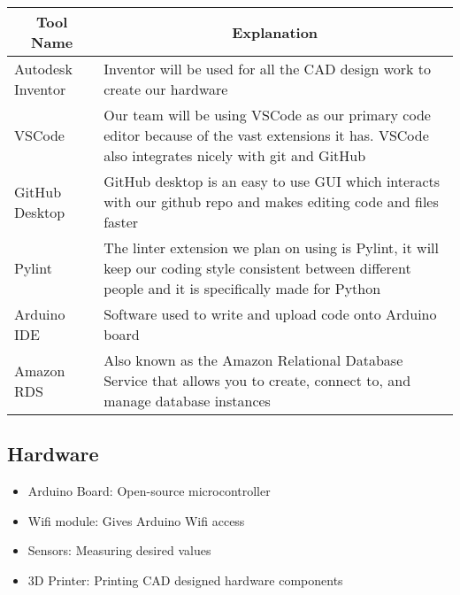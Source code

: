 \documentclass{article}
\begin{document}
\begin{table}[!hbt]
	\centering
	\begin{tabular}{|p{4cm}|p{8cm}|}
	\hline
	\multicolumn{1}{|c|}{\textbf{Tool Name}} & \multicolumn{1}{c|}{\textbf{Explanation}} 
	\\ \hline
	Autodesk Inventor
	&  Inventor will be used for all the CAD design work to create our hardware  
	\newline                              
	\\ \hline
	VSCode
	&  Our team will be using VSCode as our primary code editor because of the vast extensions it has. VSCode also integrates nicely with git and GitHub
	\newline                              
	\\ \hline
	GitHub Desktop
	&  GitHub desktop is an easy to use GUI which interacts with our github repo and makes editing code and files faster
	\newline                              
	\\ \hline
	Pylint
	&  The linter extension we plan on using is Pylint, it will keep our coding style consistent between different people and it is specifically made for Python
	\newline                              
	\\ \hline
	Arduino IDE
	&  Software used to write and upload code onto Arduino board
	\newline                     
	\\ \hline
	Amazon RDS
	&  Also known as the Amazon Relational Database Service that allows you to create, connect to, and manage database instances
	\newline                     
	\\ \hline
	\end{tabular}
\end{table}

\subsection{Hardware}
\begin{itemize}
	\item Arduino Board: Open-source microcontroller 
	\item Wifi module: Gives Arduino Wifi access
	\item Sensors: Measuring desired values
	\item 3D Printer: Printing CAD designed hardware components
\end{itemize}
\end{document}
